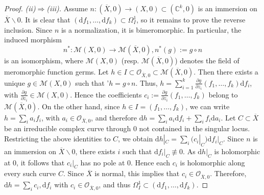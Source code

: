\documentclass[10pt,a4paper]{amsart}
\renewcommand{\setminus}{\smallsetminus}
\begin{document}
\begin{proof}
\medskip
\noindent\emph{(ii)$\Rightarrow$(iii).} Assume $n : (\overline{X},0)\to (X,0)\subset (\mathbb{C}^k,0)$ is an immersion on $\overline{X}\setminus{0}$. It is clear that $(\mathrm{d}f_1,\dots,\mathrm{d}f_k)\subset \Omega^1_I$, so it remains to prove the reverse inclusion.
Since $n$ is a normalization, it is bimeromorphic. In particular, the induced morphism
$$n^* : \mathcal{M}(X,0) \to \mathcal{M}(\overline{X},0), n^*(g):=g \circ n$$
is an isomorphism, where $\mathcal{M}(X,0)$ (resp. $\mathcal{M}(\overline{X},0)$) denotes the field of meromorphic function germs.
Let $h \in I \subset \mathcal{O}_{\overline{X},0} \subset \mathcal{M}(\overline{X},0)$. Then there exists a unique $g \in \mathcal{M}(X,0)$ such that
'$h = g \circ n$.
Thus,
$h = \sum_{i=1}^k \frac{\partial g}{\partial z_i}(f_1,\dots,f_k) \mathrm{d}f_i$,
with $\frac{\partial g}{\partial z_i} \in \mathcal{M}(X,0)$. Hence the coefficients
$c_i := \frac{\partial g}{\partial z_i}(f_1,\dots,f_k)$
belong to $\mathcal{M}(\overline X,0)$.
On the other hand, since $h \in I = (f_1,\dots,f_k)$, we can write
$h = \sum_i a_i f_i$, with $a_i \in \mathcal{O}_{\overline X,0}$, and therefore
$\mathrm{d}h = \sum_i a_i \mathrm{d}f_i + \sum_i f_i \mathrm{d}a_i$.
Let $C \subset \overline{X}$ be an irreducible complex curve through $0$ not contained in the singular locus. Restricting the above identities to $C$, we obtain
$\mathrm{d}h|_C = \sum_i (c_i|_C) \mathrm{d}f_i|_C$.
Since $n$ is an immersion on $\overline X \setminus {0}$, there exists $i$ such that $\mathrm{d}f_i|_C \not\equiv 0$. As $\mathrm{d}h|_C$ is holomorphic at $0$, it follows that $c_i|_C$ has no pole at $0$. Hence each $c_i$ is holomorphic along every such curve $C$.
Since $\overline{X}$ is normal, this implies that $c_i \in \mathcal{O}_{\overline{X},0}$. Therefore,
$\mathrm{d}h = \sum_i c_i, \mathrm{d}f_i$
with $c_i \in \mathcal{O}_{\overline{X},0}$, and thus $\Omega^1_I \subset (\mathrm{d}f_1,\dots,\mathrm{d}f_k)$.











\end{proof}
\end{document}
